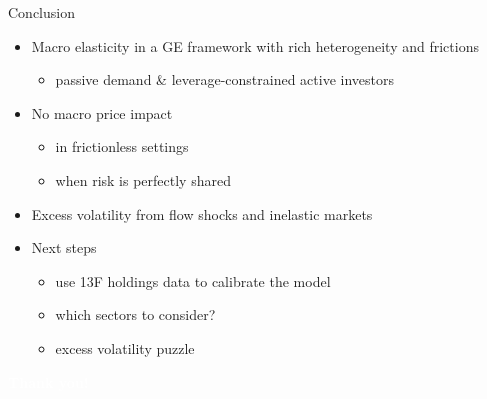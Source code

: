 \begin{frame}{Conclusion}
	\begin{itemize}
		\item Macro elasticity in a GE framework with rich heterogeneity and frictions\vspM
		\begin{itemize}
			\item passive demand \& leverage-constrained active investors\vspM
		\end{itemize}
		\item No macro price impact \vspM
		\begin{itemize}
			\item in frictionless settings\vspM
			\item when risk is perfectly shared\vspM
		\end{itemize}
		\item Excess volatility from flow shocks and inelastic markets\vspM
		\item Next steps\vspM
		\begin{itemize}
			\item use 13F holdings data to calibrate the model\vspM
			\item which sectors to consider?\vspM
			\item excess volatility puzzle
		\end{itemize}
	\end{itemize}
\end{frame}
{
	\begin{frame}
		\begin{center}
			\huge \textcolor{white}{\textbf{Thank you!}}
		\end{center}
	\end{frame}

	
}


